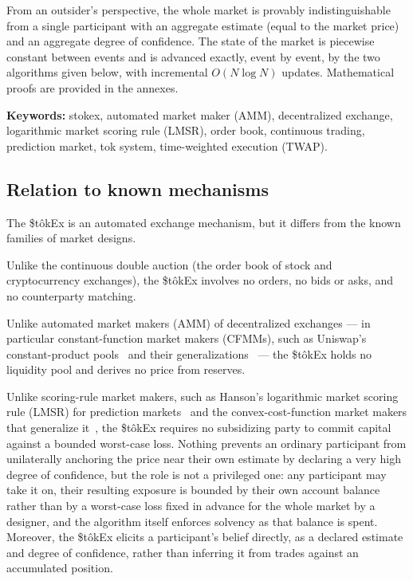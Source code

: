 \documentclass[letterpaper]{article}
\newcommand{\StokEx}{\$t\^{o}kEx}
\begin{document}
From an outsider's perspective, the whole market is provably indistinguishable from a single participant
with an aggregate estimate (equal to the market price) and an aggregate degree of confidence.
The state of the market is piecewise constant between events and is advanced exactly, event by event,
by the two algorithms given below, with incremental $O(N \log N)$ updates.
Mathematical proofs are provided in the annexes.

\textbf{Keywords:} stokex, automated market maker (AMM), decentralized exchange, logarithmic market scoring rule (LMSR),
order book, continuous trading, prediction market, tok system, time-weighted execution (TWAP).

\subsection*{Relation to known mechanisms} %
The \StokEx{} is an automated exchange mechanism, but it differs from the known families of market designs.

Unlike the continuous double auction (the order book of stock and cryptocurrency exchanges),
the \StokEx{} involves no orders, no bids or asks, and no counterparty matching.

Unlike automated market makers (AMM) of decentralized exchanges ---
in particular constant-function market makers (CFMMs),
such as Uniswap's constant-product pools~\cite{UniswapV2} and their generalizations~\cite{AngerisChitra2020} ---
the \StokEx{} holds no liquidity pool and derives no price from reserves.

Unlike scoring-rule market makers,
such as Hanson's logarithmic market scoring rule (LMSR) for prediction markets~\cite{Hanson2003}
and the convex-cost-function market makers that generalize it~\cite{AbernethyChenVaughan2013},
the \StokEx{} requires no subsidizing party to commit capital against a bounded worst-case loss.
Nothing prevents an ordinary participant from unilaterally anchoring the price near their own estimate
by declaring a very high degree of confidence,
but the role is not a privileged one: any participant may take it on,
their resulting exposure is bounded by their own account balance
rather than by a worst-case loss fixed in advance for the whole market by a designer,
and the algorithm itself enforces solvency as that balance is spent.
Moreover, the \StokEx{} elicits a participant's belief directly,
as a declared estimate and degree of confidence,
rather than inferring it from trades against an accumulated position.
\end{document}
